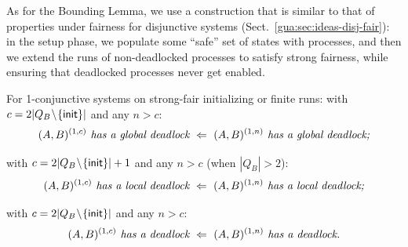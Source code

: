 As for the Bounding Lemma,
we use a construction that is similar to that of properties under fairness for disjunctive systems (Sect.~\ref{gua:sec:ideas-disj-fair}):
  in the setup phase, 
  we populate some ``safe'' set of states with processes,
  and then we extend the runs of non-deadlocked processes 
  to satisfy strong fairness, 
  while ensuring that deadlocked processes never get enabled.

\begin{lemma} \label{le:FairConjunctiveBoundingLemmaDeadlocks}
For 1-conjunctive systems on strong-fair initializing or finite runs:
\li
  \- with $c=2|Q_B\!\setminus\! \{ {\sf init} \}|$ and any $n>c$:
  $$
  \cutoffsys \textit{ has a global deadlock} 
  \ \Implied\ 
  \largesys \textit{ has a global deadlock;}
  $$

  \- with $c=2|Q_B\!\setminus\! \{ {\sf init} \}|+1$ and any $n>c$ (when $|Q_B|>2$):
  $$
  \cutoffsys \textit{ has a local deadlock} 
  \ \Implied\ 
  \largesys \textit{ has a local deadlock;}
  $$

  \- with $c=2|Q_B\!\setminus\! \{ {\sf init} \}|$ and any $n>c$:
  $$
  \cutoffsys \textit{ has a deadlock} 
  \ \Implied\ 
  \largesys \textit{ has a deadlock.}
  $$
\il
\end{lemma}

